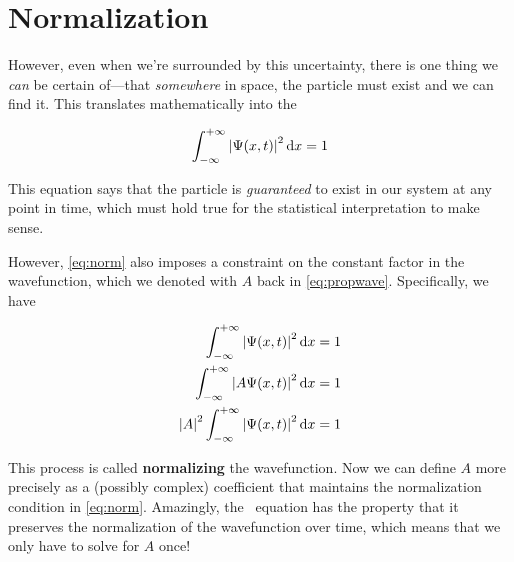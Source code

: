 \section{Normalization} \label{sec:normse}

However, even when we're surrounded by this uncertainty, there is one thing we \emph{can} be certain of---that \emph{somewhere} in space, the particle must exist and we can find it. 
This translates mathematically into the

\begin{tcolorbox}[title=Normalization condition] \vspace{-1ex}
	\begin{equation}
	\int_{-\infty}^{+\infty} \abs{\Psi(x,t)}^2 \dd{x} = 1 \label{eq:norm}
	\end{equation}
\end{tcolorbox}

This equation says that the particle is \emph{guaranteed} to exist in our system at any point in time, which must hold true for the statistical interpretation to make sense. 

However, \autoref{eq:norm} also imposes a constraint on the constant factor in the wavefunction, which we denoted with $A$ back in \autoref{eq:propwave}. 
Specifically, we have

\begin{align*}
	\int_{-\infty}^{+\infty} \abs{\Psi(x,t)}^2 \dd{x} &= 1 \\
	\int_{-\infty}^{+\infty} \abs{A\Psi(x,t)}^2 \dd{x} &= 1 \\
	\abs{A}^2 \int_{-\infty}^{+\infty} \abs{\Psi(x,t)}^2 \dd{x} &= 1
\end{align*}

This process is called \textbf{normalizing} the wavefunction. 
Now we can define $A$ more precisely as a (possibly complex) coefficient that maintains the normalization condition in \autoref{eq:norm}. 
Amazingly, the \Sch\ equation has the property that it preserves the normalization of the wavefunction over time, which means that we only have to solve for $A$ once!


